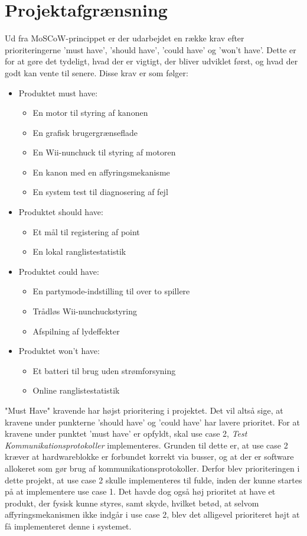 \chapter{Projektafgrænsning}

Ud fra MoSCoW-princippet er der udarbejdet en række krav efter prioriteringerne ’must have’, ’should have’, ’could have’ og ’won’t have’. Dette er for at gøre det tydeligt, hvad der er vigtigt, der bliver udviklet først, og hvad der godt kan vente til senere. Disse krav er som følger:
\begin{itemize}
	\item Produktet must have:
	\begin{itemize}
		\item En motor til styring af kanonen
		\item En grafisk brugergrænseflade
		\item En Wii-nunchuck til styring af motoren
		\item En kanon med en affyringsmekanisme
		\item En system test til diagnosering af fejl
	\end{itemize}
	\item Produktet should have:
	\begin{itemize}
		\item Et mål til registering af point
		\item En lokal ranglistestatistik
	\end{itemize}
	\item Produktet could have:
	\begin{itemize}
		\item En partymode-indstilling til over to spillere
		\item Trådløs Wii-nunchuckstyring
		\item Afspilning af lydeffekter
	\end{itemize}
	\item Produktet won’t have:
	\begin{itemize}
		\item Et batteri til brug uden strømforsyning
		\item Online ranglistestatistik
	\end{itemize}
\end{itemize}

"Must Have" kravende har højst prioritering i projektet. Det vil altså sige, at kravene under punkterne ’should have’ og ’could have’ har lavere prioritet. For at kravene under punktet 'must have' er opfyldt, skal use case 2, \textit{Test Kommunikationsprotokoller} implementeres. Grunden til dette er, at use case 2 kræver at hardwareblokke er forbundet korrekt via busser, og at der er software allokeret som gør brug af kommunikationsprotokoller. Derfor blev prioriteringen i dette projekt, at use case 2 skulle implementeres til fulde, inden der kunne startes på at implementere use case 1. Det havde dog også høj prioritet at have et produkt, der fysisk kunne styres, samt skyde, hvilket betød, at selvom affyringsmekanismen ikke indgår i use case 2, blev det alligevel prioriteret højt at få implementeret denne i systemet.






